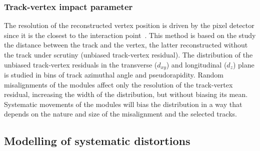 \subsubsection{Track-vertex impact parameter} %
The resolution of the reconstructed vertex position is driven by the pixel detector
since it is the closest to the interaction point~\cite{CMS-TRK-11-002}.
This method is based on the study the distance between the track and the vertex,
the latter reconstructed without the track under scrutiny (unbiased track-vertex residual).
The distribution of the unbiased track-vertex residuals in the transverse ($d_{xy}$) and longitudinal ($d_z$)
plane is studied in bins of track azimuthal angle and pseudorapidity.
Random misalignments of the modules affect only the resolution of the track-vertex residual,
increasing the width of the distribution, but without biasing its mean.
Systematic movements of the modules will bias the distribution
in a way that depends on the nature and size of the misalignment and the selected tracks.

\subsection{Modelling of systematic distortions}

